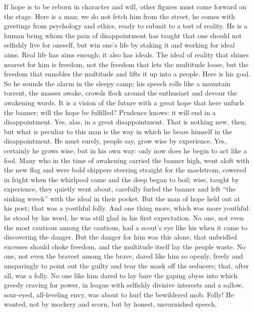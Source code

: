 \documentclass[12pt,a4paper,openany]{book}
\newcommand{\opage}[1]{\marginnote{\footnotesize\textit{[#1]}}}
\begin{document}
If hope is to be reborn in character and will, other
figures must come forward on the stage. Here is a
man; we do not fetch him from the street, he comes with
greetings from psychology and ethics, ready to submit
to a test of reality. He is a human being
whom the pain of disappointment has taught that one should not selfishly
live for oneself, but win one's life by staking
it and working for ideal aims. Real life
has aims enough; it also has ideals. The ideal of reality
that shines nearest for him is freedom, not
the freedom that lets the multitude loose, but the freedom that
ennobles the multitude and lifts it up into a people. Here is
his goal. So he sounds the alarm in the sleepy camp;
his speech rolls like a mountain torrent, the masses awake,
\setcounter{footnote}{0}%
\opage{33}crowds flock around the enthusiast and devour the
awakening words. It is a vision of the future with a great
hope that here unfurls the banner; will the hope be fulfilled?
Prudence knows: it will end in a disappointment.
Yes, alas, in a great disappointment. That is nothing
new, then; but what is peculiar to this man
is the way in which he bears himself in
the disappointment. He must surely, people say, grow wise by experience.
Yes, certainly he grows wise, but in his own way: only now
does he begin to act like a fool. Many
who in the time of awakening carried the banner high, went aloft
with the new flag and were bold skippers steering
straight for the maelstrom, cowered in fright when
the whirlpool came and the deep began to boil; wise,
taught by experience, they quietly went about, carefully
furled the banner and left ``the sinking wreck''
with the ideal in their pocket. But the man of hope held out
at his post; that was a youthful folly. And
one thing more, which was more youthful: he stood by
his word, he was still glad in his first expectation.
No one, not even the most cautious among the cautious,
had a scout's eye like his when it came to discovering
the danger. But the danger for him was this alone, that unbridled
excesses should choke freedom, and the multitude itself
lay the people waste. No one, not even the bravest among
the brave, dared like him so openly, freely and unsparingly
to point out the guilty and tear the mask off the seducers;
that, after all, was a folly. No one like him dared to lay bare
the gaping abyss into which greedy craving for power, in
league with selfishly divisive interests and a sallow,
sour-eyed, all-leveling envy, was about
to hurl the bewildered mob. Folly! He wanted,
\setcounter{footnote}{0}%
\opage{34}not by mockery and scorn, but by honest, unvarnished speech,
\end{document}
